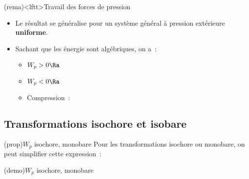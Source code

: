 \documentclass[../../main/main.tex]{subfiles}
\begin{document}
\begin{tcb}(rema)<lftt>{Travail des forces de pression}
	\begin{itemize}
		\item Le résultat se généralise pour un système général à pression extérieure
		      \textbf{uniforme}.
		\item Sachant que les énergie sont algébriques, on a~:
		      \begin{itemize}
			      \item $W_p > 0 \Ra$ 
			      \item $W_p < 0 \Ra$ %
			      \item Compression~: 
		      \end{itemize}
	\end{itemize}
\end{tcb}

\subsection{Transformations isochore et isobare}

\begin{tcb*}(prop){$W_p$ isochore, monobare}
	Pour les transformations isochore ou monobare, on peut simplifier cette
	expression~:
	\smallbreak
	\begin{isd}[sidebyside align=top]
		\psw{%
			\[
				\boxed{\delta W_p = 0}
				\Lra
				W_p = 0
			\]
		}%
		\vspace{-15pt}
		\tcblower
		\psw{%
			\[
				\boxed{W_p = -P\ind{ext}\Delta{V}}
			\]
		}%
		\vspace{-15pt}
	\end{isd}
\end{tcb*}
\begin{tcb*}[sidebyside, sidebyside align=top, lefthand ratio=.3](demo){$W_p$ isochore, monobare}
	\vspace{-15pt}
	\vspace{-15pt}
	\tcblower
	\vspace{-15pt}
	\vspace{-15pt}
\end{tcb*}
\end{document}
